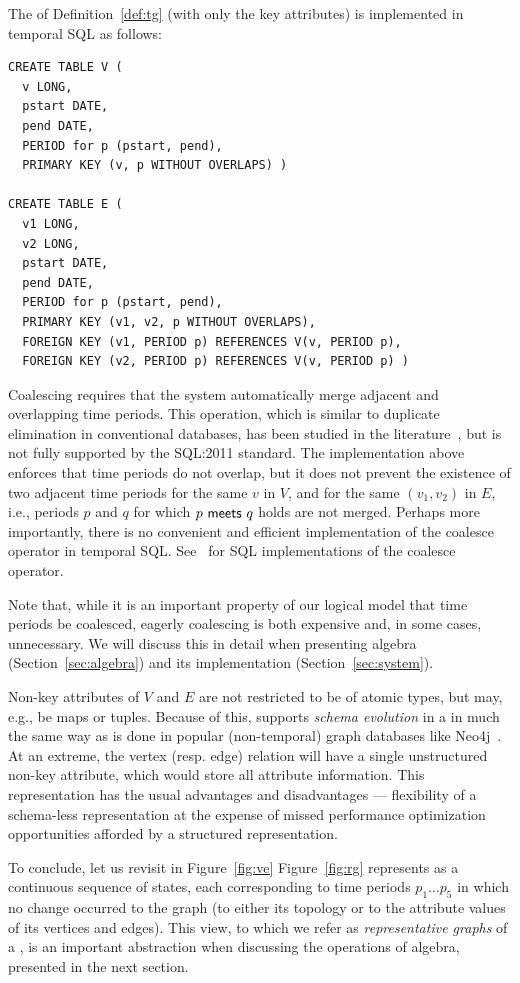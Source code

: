 The \tg of Definition~\ref{def:tg} (with only the key attributes) is
implemented in temporal SQL as follows:

\begin{small}
\begin{verbatim}
CREATE TABLE V (
  v LONG,
  pstart DATE,
  pend DATE,
  PERIOD for p (pstart, pend),
  PRIMARY KEY (v, p WITHOUT OVERLAPS) )

CREATE TABLE E (
  v1 LONG,
  v2 LONG,
  pstart DATE,
  pend DATE,
  PERIOD for p (pstart, pend),
  PRIMARY KEY (v1, v2, p WITHOUT OVERLAPS),
  FOREIGN KEY (v1, PERIOD p) REFERENCES V(v, PERIOD p),
  FOREIGN KEY (v2, PERIOD p) REFERENCES V(v, PERIOD p) )
\end{verbatim}
\end{small}

Coalescing requires that the system automatically merge adjacent and
overlapping time periods.  This operation, which is similar to
duplicate elimination in conventional databases, has been studied in
the
literature~\cite{DBLP:conf/vldb/BohlenSS96,DBLP:journals/sigmod/Zimanyi06},
but is not fully supported by the SQL:2011 standard.  The
implementation above enforces that time periods do not overlap, but it
does not prevent the existence of two adjacent time periods for the
same $v$ in $V$, and for the same $(v_1, v_2)$ in $E$, i.e., periods
$p$ and $q$ for which $p~\mathsf{meets}~q$ holds are not merged.
Perhaps more importantly, there is no convenient and efficient
implementation of the coalesce operator in temporal SQL.
See~\cite{DBLP:reference/db/Bohlen09} for SQL implementations of the
coalesce operator.

Note that, while it is an important property of our logical model that
time periods be coalesced, eagerly coalescing is both expensive and,
in some cases, unnecessary.  We will discuss this in detail when
presenting \tg algebra (Section~\ref{sec:algebra}) and its
implementation (Section~\ref{sec:system}).

Non-key attributes of $V$ and $E$ are not restricted to be of atomic
types, but may, e.g., be maps or tuples.  Because of this, \ql
supports {\em schema evolution} in a \tg in much the same way as is
done in popular (non-temporal) graph databases like Neo4j~\cite{}.  At
an extreme, the vertex (resp. edge) relation will have a single
unstructured non-key attribute, which would store all attribute
information.  This representation has the usual advantages and
disadvantages --- flexibility of a schema-less representation at the
expense of missed performance optimization opportunities afforded by a
structured representation.

To conclude, let us revisit \tg {} in Figure~\ref{fig:ve}
Figure~\ref{fig:rg} represents  as a continuous sequence of
states, each corresponding to time periods $p_1 \ldots p_5$ in which
no change occurred to the graph (to either its topology or to the
attribute values of its vertices and edges).  This view, to which we
refer as {\em representative graphs} of a \tg, is an important
abstraction when discussing the operations of \tg algebra, presented
in the next section.
